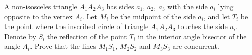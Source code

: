 A non-isosceles triangle $A_{1}A_{2}A_{3}$ has sides $a_{1}$,  $a_{2}$,  $a_{3}$ with the side $a_{i}$ lying opposite to the vertex $A_{i}$. Let $M_{i}$ be the midpoint of the side $a_{i}$,  and let $T_{i}$ be the point where the inscribed circle of triangle $A_{1}A_{2}A_{3}$ touches the side $a_{i}$. Denote by $S_{i}$ the reflection of the point $T_{i}$ in the interior angle bisector of the angle $A_{i}$. Prove that the lines $M_{1}S_{1}$,  $M_{2}S_{2}$ and $M_{3}S_{3}$ are concurrent.